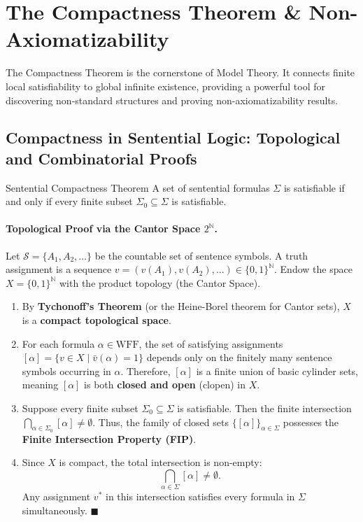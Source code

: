 \section{The Compactness Theorem \& Non-Axiomatizability}
\label{sec:compactness_applications}

The Compactness Theorem is the cornerstone of Model Theory. It connects finite local satisfiability to global infinite existence, providing a powerful tool for discovering non-standard structures and proving non-axiomatizability results.

\subsection{Compactness in Sentential Logic: Topological and Combinatorial Proofs}

\begin{theorembox}{Sentential Compactness Theorem}
A set of sentential formulas $\Sigma$ is satisfiable if and only if every finite subset $\Sigma_0 \subseteq \Sigma$ is satisfiable.
\end{theorembox}

\paragraph{Topological Proof via the Cantor Space $2^\mathbb{N}$.}
Let $\mathcal{S} = \{A_1, A_2, \dots\}$ be the countable set of sentence symbols. A truth assignment is a sequence $v = (v(A_1), v(A_2), \dots) \in \{0, 1\}^\mathbb{N}$.
Endow the space $X = \{0, 1\}^\mathbb{N}$ with the product topology (the Cantor Space).
\begin{enumerate}[leftmargin=1.4em,itemsep=2pt]
  \item By \textbf{Tychonoff's Theorem} (or the Heine-Borel theorem for Cantor sets), $X$ is a \textbf{compact topological space}.
  \item For each formula $\alpha \in \mathrm{WFF}$, the set of satisfying assignments $[\alpha] = \{ v \in X \mid \bar{v}(\alpha) = 1 \}$ depends only on the finitely many sentence symbols occurring in $\alpha$. Therefore, $[\alpha]$ is a finite union of basic cylinder sets, meaning $[\alpha]$ is both \textbf{closed and open} (clopen) in $X$.
  \item Suppose every finite subset $\Sigma_0 \subseteq \Sigma$ is satisfiable. Then the finite intersection $\bigcap_{\alpha \in \Sigma_0} [\alpha] \neq \emptyset$.
  Thus, the family of closed sets $\{ [\alpha] \}_{\alpha \in \Sigma}$ possesses the \textbf{Finite Intersection Property (FIP)}.
  \item Since $X$ is compact, the total intersection is non-empty:
  \[
  \bigcap_{\alpha \in \Sigma} [\alpha] \neq \emptyset.
  \]
  Any assignment $v^*$ in this intersection satisfies every formula in $\Sigma$ simultaneously. $\blacksquare$
\end{enumerate}

